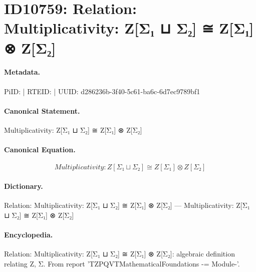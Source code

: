 \section*{ID10759: Relation: Multiplicativity: Z[Σ₁ ⊔ Σ₂] ≅ Z[Σ₁] ⊗ Z[Σ₂]}
\paragraph{Metadata.}
PiID:  | RTEID:  | UUID: d286236b-3f40-5c61-ba6c-6d7ec9789bf1

\paragraph{Canonical Statement.}
Multiplicativity: Z[Σ₁ ⊔ Σ₂] ≅ Z[Σ₁] ⊗ Z[Σ₂]

\paragraph{Canonical Equation.}
\[
Multiplicativity: Z[Σ₁ ⊔ Σ₂] ≅ Z[Σ₁] ⊗ Z[Σ₂]
\]

\paragraph{Dictionary.}
Relation: Multiplicativity: Z[Σ₁ ⊔ Σ₂] ≅ Z[Σ₁] ⊗ Z[Σ₂] — Multiplicativity: Z[Σ₁ ⊔ Σ₂] ≅ Z[Σ₁] ⊗ Z[Σ₂]

\paragraph{Encyclopedia.}
Relation: Multiplicativity: Z[Σ₁ ⊔ Σ₂] ≅ Z[Σ₁] ⊗ Z[Σ₂]: algebraic definition relating Z, Σ. From report 'TZPQVTMathematicalFoundations -= Module-'.
